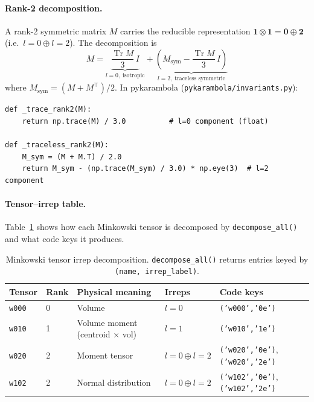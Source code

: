 \documentclass[11pt,a4paper]{article}
\begin{document}
\paragraph{Rank-2 decomposition.}
A rank-2 symmetric matrix $M$ carries the reducible representation
$\mathbf{1} \otimes \mathbf{1} = \mathbf{0} \oplus \mathbf{2}$ (i.e.\
$l=0 \oplus l=2$).
The decomposition is
\begin{equation}
  M = \underbrace{\frac{\operatorname{Tr} M}{3}\, I}_{l=0,\;\text{isotropic}}
    + \underbrace{\!\left(M_\mathrm{sym} - \frac{\operatorname{Tr} M}{3}\, I\right)\!}_{l=2,\;\text{traceless symmetric}}
  \label{eq:rank2decomp}
\end{equation}
where $M_\mathrm{sym} = (M + M^\top)/2$.
In pykarambola (\texttt{pykarambola/invariants.py}):
\begin{lstlisting}
def _trace_rank2(M):
    return np.trace(M) / 3.0          # l=0 component (float)

def _traceless_rank2(M):
    M_sym = (M + M.T) / 2.0
    return M_sym - (np.trace(M_sym) / 3.0) * np.eye(3)  # l=2 component
\end{lstlisting}

\paragraph{Tensor--irrep table.}
Table~\ref{tab:irreps} shows how each Minkowski tensor is decomposed by
\texttt{decompose\_all()} and what code keys it produces.

\begin{table}[h]
\centering
\caption{Minkowski tensor irrep decomposition.
         \texttt{decompose\_all()} returns entries keyed by
         \texttt{(name, irrep\_label)}.}
\label{tab:irreps}
\begin{tabularx}{\linewidth}{llllX}
\toprule
Tensor & Rank & Physical meaning & Irreps & Code keys \\
\midrule
\texttt{w000} & 0 & Volume & $l=0$ & \texttt{('w000','0e')} \\
\texttt{w010} & 1 & Volume moment (centroid $\times$ vol) & $l=1$ & \texttt{('w010','1e')} \\
\texttt{w020} & 2 & Moment tensor & $l=0 \oplus l=2$ & \texttt{('w020','0e')}, \texttt{('w020','2e')} \\
\texttt{w102} & 2 & Normal distribution & $l=0 \oplus l=2$ & \texttt{('w102','0e')}, \texttt{('w102','2e')} \\
\bottomrule
\end{tabularx}
\end{table}
\end{document}
